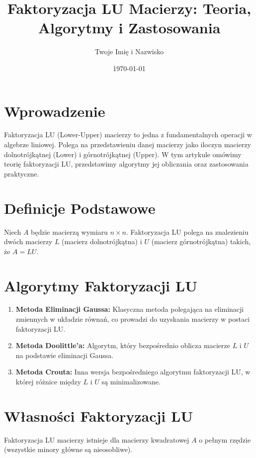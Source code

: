 \documentclass[12pt]{article}
\title{Faktoryzacja LU Macierzy: Teoria, Algorytmy i Zastosowania}
\author{Twoje Imię i Nazwisko}
\date{\today}
\begin{document}
\maketitle

\section{Wprowadzenie}
Faktoryzacja LU (Lower-Upper) macierzy to jedna z fundamentalnych operacji w algebrze liniowej. Polega na przedstawieniu danej macierzy jako iloczyn macierzy dolnotrójkątnej (Lower) i górnotrójkątnej (Upper). W tym artykule omówimy teorię faktoryzacji LU, przedstawimy algorytmy jej obliczania oraz zastosowania praktyczne.

\section{Definicje Podstawowe}
\begin{definition}
Niech $A$ będzie macierzą wymiaru $n \times n$. Faktoryzacja LU polega na znalezieniu dwóch macierzy $L$ (macierz dolnotrójkątna) i $U$ (macierz górnotrójkątna) takich, że $A = LU$.
\end{definition}

\section{Algorytmy Faktoryzacji LU}
\begin{enumerate}
  \item \textbf{Metoda Eliminacji Gaussa:} Klasyczna metoda polegająca na eliminacji zmiennych w układzie równań, co prowadzi do uzyskania macierzy w postaci faktoryzacji LU.
  
  \item \textbf{Metoda Doolittle'a:} Algorytm, który bezpośrednio oblicza macierze $L$ i $U$ na podstawie eliminacji Gaussa.
  
  \item \textbf{Metoda Crouta:} Inna wersja bezpośredniego algorytmu faktoryzacji LU, w której różnice między $L$ i $U$ są minimalizowane.
\end{enumerate}

\section{Własności Faktoryzacji LU}
\begin{theorem}
Faktoryzacja LU macierzy istnieje dla macierzy kwadratowej $A$ o pełnym rzędzie (wszystkie minory główne są nieosobliwe).
\end{theorem}
\end{document}
